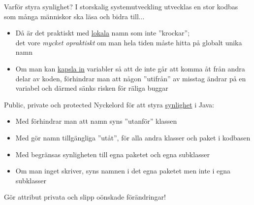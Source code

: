 \documentclass{lecturenotes}
\begin{document}
\begin{Slide}{Varför styra synlighet?}
I storskalig systemutveckling utvecklas en stor kodbas som många människor ska läsa och bidra till...
\begin{itemize}
\item Då är det praktiskt med \href{https://en.wikipedia.org/wiki/Local_variable}{lokala} namn som inte ''krockar''; \\det vore \textit{mycket opraktiskt} om man hela tiden måste hitta på globalt unika namn
\item Om man kan \href{https://en.wikipedia.org/wiki/Encapsulation_\%28computer_programming\%29}{kapsla in} variabler så att de inte går att komma åt från andra delar av koden, förhindrar man att  någon ''utifrån'' av misstag ändrar på en variabel och därmed sänks risken för räliga buggar
\end{itemize}
\end{Slide}

\begin{Slide}{Public, private och protected}
Nyckelord för att styra \href{http://stackoverflow.com/questions/215497/in-java-whats-the-difference-between-public-default-protected-and-private}{synlighet} i Java:
\begin{itemize}
\item Med  förhindrar man att namn syns ''utanför'' klassen
\item Med  gör namn tillgängliga ''utåt'', för alla andra klasser och paket i kodbasen
\item Med  begränsas synligheten till egna paketet och egna subklasser
\item Om man inget skriver, syns namnen i det egna paketet men inte i egna subklasser
\end{itemize}
\end{Slide}

\begin{Slide}{Gör attribut privata och slipp oönskade förändringar!}

\end{Slide}
\end{document}
